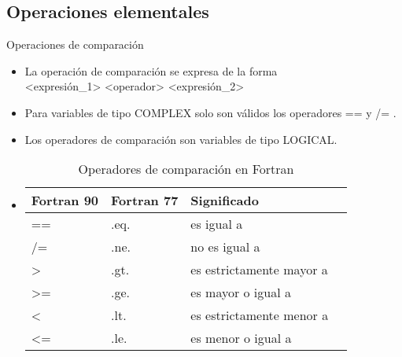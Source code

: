 
\subsection{Operaciones elementales}


\begin{frame}[fragile]{Operaciones de comparación}  
 \begin{itemize}[<+(0)->]
  \item La operación de comparación se expresa de la forma \\
      \centering <expresión\_1> <operador> <expresión\_2>
  \item Para variables de tipo COMPLEX solo son válidos los operadores == y /= .
  \item Los operadores de comparación son variables de tipo LOGICAL.
    \vspace{0.4cm}
  \item []
    \begin{table}[]
    \centering
    \label{Tabla_comparacion}
    \begin{tabular}{|l|l|l|l|}
    \hline
    Fortran 90  & Fortran 77    & Significado                  \\ \hline
    ==          & .eq.          & es igual a                   \\ \hline
    /=          & .ne.          & no es igual a                \\ \hline
    >           & .gt.          & es estrictamente mayor a     \\ \hline
    >=          & .ge.          & es mayor o igual a           \\ \hline
    <           & .lt.          & es estrictamente menor a     \\ \hline
    <=          & .le.          & es menor o igual a           \\ \hline              
    \end{tabular}
    \caption*{Operadores de comparación en Fortran}
    \end{table}
 \end{itemize}
\end{frame}


